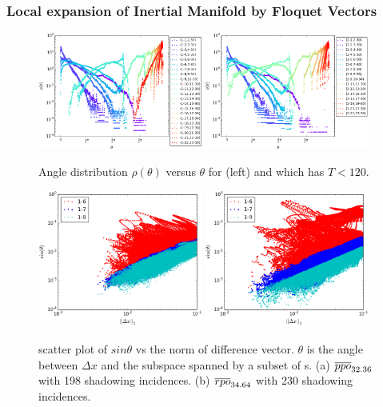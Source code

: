 \documentclass[mathserif, handout]{beamer}
\begin{document}
\begin{frame}[allowframebreaks]
  \frametitle{Local expansion of Inertial Manifold by Floquet Vectors}

  \begin{figure}[h]
    \centering
    \includegraphics[width=0.48\textwidth]{angle120ppoSpace1} \hfill
    \includegraphics[width=0.48\textwidth]{angle120rpoSpace1}
    \caption{Angle distribution $\rho(\theta)$ versus $\theta$
      for  (left) and  which has $ T < 120$.
    }
    \label{fig:angDist}
  \end{figure}

  \begin{figure}[h]
    \centering
    \includegraphics[width=0.48\textwidth]{ppo3truncated} \hfill
    \includegraphics[width=0.48\textwidth]{rpo4truncated}
    \caption{
      scatter plot of $sin\theta$ vs the norm of difference vector.
      $\theta$ is the angle between $\Delta x$ and the subspace spanned
      by a subset of \Fv s.
      (a) ${\overline{ppo}}_{32.36}$ with 198 shadowing incidences.
      (b) ${\overline{rpo}}_{34.64}$ with 230 shadowing incidences.
    }
    \label{fig:angApproach}
  \end{figure}

\end{frame}
\end{document}
